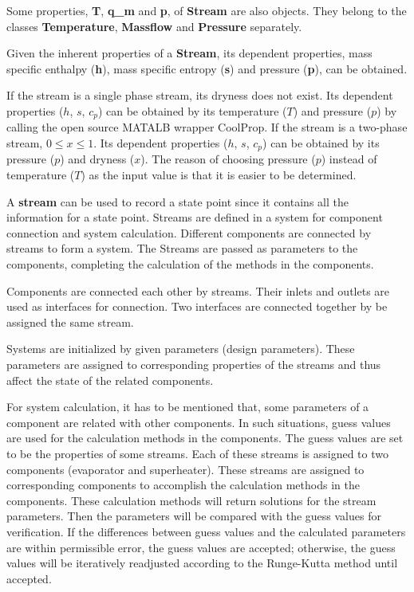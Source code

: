 Some properties, \textbf{T}, \textbf{q\_m} and \textbf{p}, of \textbf{Stream} are also objects. They belong to the classes \textbf{Temperature}, \textbf{Massflow} and \textbf{Pressure} separately.

Given the inherent properties of a \textbf{Stream}, its dependent properties, mass specific enthalpy (\textbf{h}), mass specific entropy (\textbf{s}) and pressure (\textbf{p}), can be obtained.

If the stream is a single phase stream, its dryness does not exist. Its dependent properties ($h$, $s$, $c_p$) can be obtained by its temperature ($T$) and pressure ($p$) by calling the open source MATALB wrapper CoolProp. If the stream is a two-phase stream, $0 \leqslant x \leqslant 1$. Its dependent properties ($h$, $s$, $c_p$) can be obtained by its pressure ($p$) and dryness ($x$). The reason of choosing pressure ($p$) instead of temperature ($T$) as the input value is that it is easier to be determined.

A \textbf{stream} can be used to record a state point since it contains all the information for a state point. Streams are defined in a system for component connection and system calculation. Different components are connected by streams to form a system. The Streams are passed as parameters to the components, completing the calculation of the methods in the components.

Components are connected each other by streams. Their inlets and outlets are used as interfaces for connection. 
Two interfaces are connected together by be assigned the same stream.

Systems are initialized by given parameters (design parameters). These parameters are assigned to corresponding properties of the streams and thus affect the state of the related components.

For system calculation, it has to be mentioned that, some parameters of a component are related with other components. 
In such situations, guess values are used for the calculation methods in the components.
The guess values are set to be the properties of some streams. Each of these streams is assigned to two components (evaporator and superheater). These streams are assigned to corresponding components to accomplish the calculation methods in the components. These calculation methods will return solutions for the stream parameters. Then the parameters will be compared with the guess values for verification. If the differences between guess values and the calculated parameters are within permissible error, the guess values are accepted; otherwise, the guess values will be iteratively readjusted according to the Runge-Kutta method until accepted.


